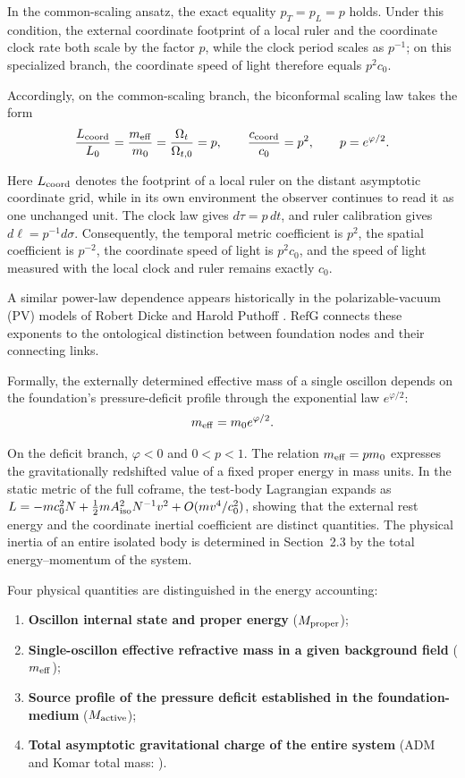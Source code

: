 \documentclass[11pt,a4paper]{article}
\newcommand{\RefG}{\mathrm{RefG}}
\begin{document}
In the common-scaling ansatz, the exact equality $p_T=p_L=p$ holds. Under this condition, the external coordinate footprint of a local ruler and the coordinate clock rate both scale by the factor $p$, while the clock period scales as $p^{-1}$; on this specialized branch, the coordinate speed of light therefore equals $p^2 c_0$.

Accordingly, on the common-scaling branch, the biconformal scaling law takes the form
\begin{equation}
\frac{L_{\rm coord}}{L_0} = \frac{m_{\rm eff}}{m_0} = \frac{\Omega_t}{\Omega_{t,0}} = p, \qquad \frac{c_{\rm coord}}{c_0} = p^2, \qquad p = e^{\varphi/2}.
\end{equation}

Here $L_{\rm coord}$ denotes the footprint of a local ruler on the distant asymptotic coordinate grid, while in its own environment the observer continues to read it as one unchanged unit. The clock law gives $d\tau=p\,dt$, and ruler calibration gives $d\ell=p^{-1}d\sigma$. Consequently, the temporal metric coefficient is $p^2$, the spatial coefficient is $p^{-2}$, the coordinate speed of light is $p^2c_0$, and the speed of light measured with the local clock and ruler remains exactly $c_0$.

A similar power-law dependence appears historically in the polarizable-vacuum (PV) models of Robert Dicke and Harold Puthoff \citep{dicke1957,puthoff2002}. $\RefG$ connects these exponents to the ontological distinction between foundation nodes and their connecting links.

Formally, the externally determined effective mass of a single oscillon depends on the foundation's pressure-deficit profile through the exponential law $e^{\varphi/2}$:
\begin{equation}
m_{\rm eff} = m_0 e^{\varphi/2}.
\end{equation}

On the deficit branch, $\varphi < 0$ and $0 < p < 1$. The relation $m_{\rm eff} = p m_0$ expresses the gravitationally redshifted value of a fixed proper energy in mass units. In the static metric of the full coframe, the test-body Lagrangian expands as $L = -mc_0^2 N + \tfrac12 m A_{\rm iso}^2 N^{-1}v^2 + O(mv^4/c_0^2)$, showing that the external rest energy and the coordinate inertial coefficient are distinct quantities. The physical inertia of an entire isolated body is determined in Section~2.3 by the total energy--momentum of the system.

Four physical quantities are distinguished in the energy accounting:
\begin{enumerate}[label=\arabic*.]
\item \textbf{Oscillon internal state and proper energy} ($M_{\rm proper}$);
\item \textbf{Single-oscillon effective refractive mass in a given background field} ($m_{\rm eff}$);
\item \textbf{Source profile of the pressure deficit established in the foundation-medium} ($M_{\rm active}$);
\item \textbf{Total asymptotic gravitational charge of the entire system} (ADM and Komar total mass: \citealt{arnowitt1962,komar1959}).
\end{enumerate}
\end{document}
